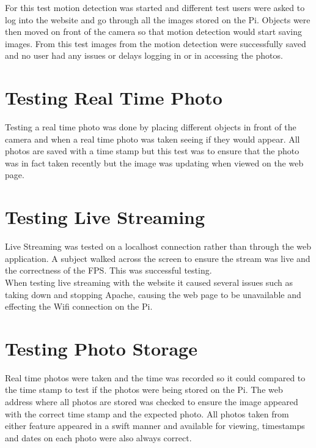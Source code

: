 \documentclass[12pt]{report}
\begin{document}
For this test motion detection was started and different test users were asked to log into the website and go through all the images stored on the Pi. Objects were then moved on front of the camera so that motion detection would start saving images. From this test images from the motion detection were successfully saved and no user had any issues or delays logging in or in accessing the photos.\\

\section{Testing Real Time Photo}
\label{sec:realPhotoTest}
%

Testing a real time photo was done by placing different objects in front of the camera and when a real time photo was taken seeing if they would appear. All photos are saved with a time stamp but this test was to ensure that the photo was in fact taken recently but the image was updating when viewed on the web page.\\


\section{Testing Live Streaming}
\label{sec:liveStreamTest}
%
Live Streaming was tested on a localhost connection rather than through the web application. A subject walked across the screen to ensure the stream was live and the correctness of the FPS. This was successful testing.\\
 
When testing live streaming with the website it caused several issues such as taking down and stopping Apache, causing the web page to be unavailable and effecting the Wifi connection on the Pi.

\section{Testing Photo Storage}
\label{sec:photoStorageTest}
%
Real time photos were taken and the time was recorded so it could compared to the time stamp to test if the photos were being stored on the Pi. The web address where all photos are stored was checked to ensure the image appeared with the correct time stamp and the expected photo. All photos taken from either feature appeared in a swift manner and available for viewing, timestamps and dates on each photo were also always correct.\\
\end{document}
